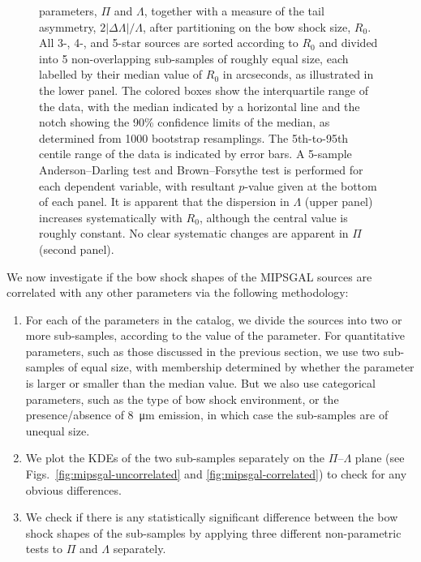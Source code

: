 \documentclass[useAMS, usenatbib, a4paper]{mnras}
\begin{document}
\begin{figure}
{    parameters, \(\Pi\) and \(\Lambda\), together with a measure of the tail
    asymmetry, \(2 |\Delta\Lambda| / \Lambda\), after partitioning on the bow shock
    size, \(R_0\).  All 3-, 4-, and 5-star sources are sorted
    according to \(R_0\) and divided into 5 non-overlapping
    sub-samples of roughly equal size, each labelled by their median
    value of \(R_0\) in arcseconds, as illustrated in the lower panel.
    The colored boxes show the interquartile range of the data, with
    the median indicated by a horizontal line and the notch showing
    the 90\% confidence limits of the median, as determined from 1000
    bootstrap resamplings.  The 5th-to-95th centile range of the data
    is indicated by error bars.  A 5-sample Anderson--Darling test and
    Brown--Forsythe test is performed for each dependent variable, with
    resultant \(p\)-value given at the bottom of each panel.  It is
    apparent that the dispersion in \(\Lambda\) (upper panel) increases
    systematically with \(R_0\), although the central value is roughly
    constant.  No clear systematic changes are apparent in \(\Pi\)
    (second panel).}
  \label{fig:mipsgal-boxplot}
\end{figure}


We now investigate if the bow shock shapes of the MIPSGAL sources are
correlated with any other parameters via the following methodology:
\begin{enumerate}[1.]
\item For each of the parameters in the \citet{Kobulnicky:2016a}
  catalog, we divide the sources into two or more sub-samples,
  according to the value of the parameter.  For quantitative
  parameters, such as those discussed in the previous section, we use
  two sub-samples of equal size, with membership determined by whether
  the parameter is larger or smaller than the median value.  But we
  also use categorical parameters, such as the type of bow shock
  environment, or the presence/absence of \SI{8}{\um} emission, in
  which case the sub-samples are of unequal size.
\item We plot the KDEs of the two sub-samples separately on the
  \(\Pi\)--\(\Lambda\) plane (see Figs.~\ref{fig:mipsgal-uncorrelated} and
  \ref{fig:mipsgal-correlated}) to check for any obvious
  differences.
\item We check if there is any statistically significant difference
  between the bow shock shapes of the sub-samples by applying three
  different non-parametric tests to \(\Pi\) and \(\Lambda\)
  separately.  
\end{enumerate}
\end{document}
